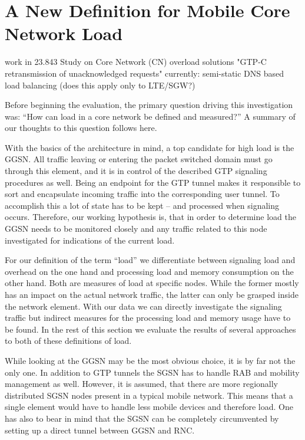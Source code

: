 \section{A New Definition for Mobile Core Network Load}
\label{c4:loaddefinition}

work in 23.843 \cite{3gpp.23.843} Study on Core Network (CN) overload solutions
"GTP-C retransmission of unacknowledged requests"
currently: semi-static DNS based load balancing (does this apply only to LTE/SGW?)


Before beginning the evaluation, the primary question driving this investigation was: ``How can load in a core network be defined and measured?'' A summary of our thoughts to this question follows here.

With the basics of the architecture in mind, a top candidate for high load is the \gls{GGSN}. All traffic leaving or entering the packet switched domain must go through this element, and it is in control of the described GTP signaling procedures as well. Being an endpoint for the GTP tunnel makes it responsible to sort and encapsulate incoming traffic into the corresponding user tunnel. To accomplish this a lot of state has to be kept -- and processed when signaling occurs. Therefore, our working hypothesis is, that in order to determine load the \gls{GGSN} needs to be monitored closely and any traffic related to this node investigated for indications of the current load.

For our definition of the term ``load'' we differentiate between signaling load and overhead on the one hand and processing load and memory consumption on the other hand. Both are measures of load at specific nodes. While the former mostly has an impact on the actual network traffic, the latter can only be grasped inside the network element. With our data we can directly investigate the signaling traffic but indirect measures for the processing load and memory usage have to be found. In the rest of this section we evaluate the results of several approaches to both of these definitions of load.

While looking at the \gls{GGSN} may be the most obvious choice, it is by far not the only one. 
In addition to GTP tunnels the \gls{SGSN} has to handle \gls{RAB} and mobility management as well. However, it is assumed, that there are more regionally distributed \gls{SGSN} nodes present in a typical mobile network. This means that a single element would have to handle less mobile devices and therefore load. One has also to bear in mind that the \gls{SGSN} can be completely circumvented by setting up a direct tunnel between \gls{GGSN} and \gls{RNC}.

